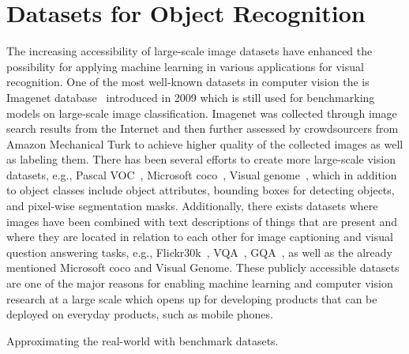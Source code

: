 
\section{Datasets for Object Recognition} %
\label{sec:datasets_for_object_recognition}

The increasing accessibility of large-scale image datasets have enhanced the possibility for applying machine learning in various applications for visual recognition. One of the most well-known datasets in computer vision the is Imagenet database~\cite{deng2009imagenet} introduced in 2009 which is still used for benchmarking models on large-scale image classification. Imagenet was collected through image search results from the Internet and then further assessed by crowdsourcers from Amazon Mechanical Turk to achieve higher quality of the collected images as well as labeling them. There has been several efforts to create more large-scale vision datasets, e.g., Pascal VOC~\cite{everingham2015pascal}, Microsoft coco~\cite{lin2014microsoft}, Visual genome~\cite{krishna2017visual}, which in addition to object classes include object attributes, bounding boxes for detecting objects, and pixel-wise segmentation masks. Additionally, there exists datasets where images have been combined with text descriptions of things that are present and where they are located in relation to each other for image captioning and visual question answering tasks, e.g., Flickr30k~\cite{young2014image}, VQA~\cite{antol2015vqa}, GQA~\cite{hudson2019gqa}, as well as the already mentioned Microsoft coco and Visual Genome. These publicly accessible datasets are one of the major reasons for enabling machine learning and computer vision research at a large scale which opens up for developing products that can be deployed on everyday products, such as mobile phones.  

Approximating the real-world with benchmark datasets. 